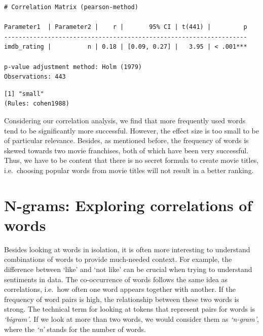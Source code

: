 \documentclass[
  letterpaper,
]{krantz}
\makeatletter
\newenvironment{Shaded}{\begin{snugshade}}{\end{snugshade}}
\newcommand{\AttributeTok}[1]{\textcolor[rgb]{0.40,0.45,0.13}{#1}}
\newcommand{\CommentTok}[1]{\textcolor[rgb]{0.37,0.37,0.37}{#1}}
\newcommand{\FunctionTok}[1]{\textcolor[rgb]{0.28,0.35,0.67}{#1}}
\newcommand{\NormalTok}[1]{\textcolor[rgb]{0.00,0.23,0.31}{#1}}
\newcommand{\SpecialCharTok}[1]{\textcolor[rgb]{0.37,0.37,0.37}{#1}}
\newcommand{\StringTok}[1]{\textcolor[rgb]{0.13,0.47,0.30}{#1}}
\newenvironment{kframe}{%
\medskip{}
\setlength{\fboxsep}{.8em}
 \def\at@end@of@kframe{}%
 \ifinner\ifhmode%
  \def\at@end@of@kframe{\end{minipage}}%
  \begin{minipage}{\columnwidth}%
 \fi\fi%
 \def\FrameCommand##1{\hskip\@totalleftmargin \hskip-\fboxsep
 \colorbox{shadecolor}{##1}\hskip-\fboxsep
     \hskip-\linewidth \hskip-\@totalleftmargin \hskip\columnwidth}%
 \MakeFramed {\advance\hsize-\width
   \@totalleftmargin\z@ \linewidth\hsize
   \@setminipage}}%
 {\par\unskip\endMakeFramed%
 \at@end@of@kframe}
\renewenvironment{Shaded}{\begin{kframe}}{\end{kframe}}
\makeatother
\begin{document}
\begin{verbatim}
# Correlation Matrix (pearson-method)

Parameter1  | Parameter2 |    r |       95% CI | t(441) |         p
-------------------------------------------------------------------
imdb_rating |          n | 0.18 | [0.09, 0.27] |   3.95 | < .001***

p-value adjustment method: Holm (1979)
Observations: 443
\end{verbatim}

\begin{Shaded}
\end{Shaded}

\begin{verbatim}
[1] "small"
(Rules: cohen1988)
\end{verbatim}

Considering our correlation analysis, we find that more frequently used
words tend to be significantly more successful. However, the effect size
is too small to be of particular relevance. Besides, as mentioned
before, the frequency of words is skewed towards two movie franchises,
both of which have been very successful. Thus, we have to be content
that there is no secret formula to create movie titles, i.e.~choosing
popular words from movie titles will not result in a better ranking.

\section{N-grams: Exploring correlations of words}\label{sec-n-grams}

Besides looking at words in isolation, it is often more interesting to
understand combinations of words to provide much-needed context. For
example, the difference between `like' and `not like' can be crucial
when trying to understand sentiments in data. The co-occurrence of words
follows the same idea as correlations, i.e.~how often one word appears
together with another. If the frequency of word pairs is high, the
relationship between these two words is strong. The technical term for
looking at tokens that represent pairs for words is \emph{`bigram'}. If
we look at more than two words, we would consider them as
\emph{`n-gram'}, where the \emph{`n'} stands for the number of words.
\end{document}
